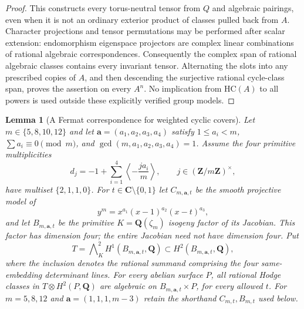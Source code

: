 \documentclass[10pt,reqno]{article}
\theoremstyle{emphasizedplain}
\newtheorem{lemma}[theorem]{Lemma}
\theoremstyle{emphasizeddefinition}
\theoremstyle{emphasizeddefinition}
\newcommand{\Q}{\mathbf Q}
\newcommand{\C}{\mathbf C}
\newcommand{\Z}{\mathbf Z}
\begin{document}
\begin{proof}
This constructs every torus-neutral tensor from $Q$ and algebraic
pairings, even when it is not an ordinary exterior product of classes
pulled back from $A$. Character projections and tensor permutations
may be performed after scalar extension: endomorphism eigenspace
projectors are complex linear combinations of rational algebraic
correspondences. Consequently the complex span of rational algebraic
classes contains every invariant tensor. Alternating the slots into
any prescribed copies of $A$, and then descending the surjective
rational cycle-class span, proves the assertion on every $A^n$.
No implication from $\mathrm{HC}(A)$ to all powers is used outside
these explicitly verified group models.
\end{proof}

\begin{lemma}[A Fermat correspondence for weighted cyclic covers]
\label{p:cyclic-transfer}
Let $m\in\{5,8,10,12\}$ and let $\boldsymbol a=(a_1,a_2,a_3,a_4)$
satisfy $1\le a_i<m$, $\sum a_i\equiv0\pmod m$, and
$\gcd(m,a_1,a_2,a_3,a_4)=1$. Assume the four primitive multiplicities
\[
 d_j=-1+\sum_{i=1}^4\left\langle-\frac{ja_i}{m}\right\rangle,
 \qquad j\in(\Z/m\Z)^\times,
\]
have multiset $\{2,1,1,0\}$. For $t\in\C\setminus\{0,1\}$ let
$C_{m,\boldsymbol a,t}$ be the smooth projective model of
\[
 y^m=x^{a_1}(x-1)^{a_2}(x-t)^{a_3},
\]
and let $B_{m,\boldsymbol a,t}$ be the primitive $K=\Q(\zeta_m)$
isogeny factor of its Jacobian. This factor has dimension four;
the entire Jacobian need not have dimension four. Put
\[
 T=\bigwedge\nolimits_K^2 H^1(B_{m,\boldsymbol a,t},\Q)
 \subset H^2(B_{m,\boldsymbol a,t},\Q),
\]
where the inclusion denotes the rational summand comprising the four
same-embedding determinant lines. For every abelian surface $P$, all
rational Hodge classes in $T\otimes H^2(P,\Q)$ are algebraic on
$B_{m,\boldsymbol a,t}\times P$, for every allowed $t$.
For $m=5,8,12$ and $\boldsymbol a=(1,1,1,m-3)$ retain the shorthand
$C_{m,t},B_{m,t}$ used below.
\end{lemma}
\end{document}
